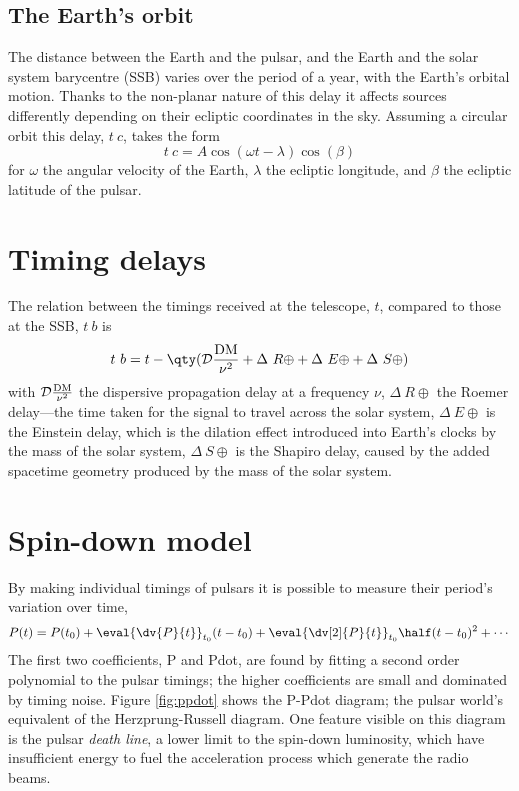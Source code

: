 \subsection{The Earth's orbit}
\label{sec:earths-orbit}

The distance between the Earth and the pulsar, and the Earth and the
solar system barycentre (SSB) varies over the period of a year, with
the Earth's orbital motion. Thanks to the non-planar nature of this
delay it affects sources differently depending on their ecliptic
coordinates in the sky. Assuming a circular orbit this delay, $t~c$,
takes the form
\begin{equation}
  \label{eq:timing-3}
  t~c = A \cos(\omega t - \lambda) \cos(\beta)
\end{equation}
for $\omega$ the angular velocity of the Earth, $\lambda$ the ecliptic
longitude, and $\beta$ the ecliptic latitude of the pulsar.

\section{Timing delays}
\label{sec:timing-delays}

The relation between the timings received at the telescope, $t$,
compared to those at the SSB, $t~b$ is
\begin{equation}
  \label{eq:4}
  t~b = t - \qty( {\cal D} \frac{\DM}{ \nu^2} + \Delta~{R \oplus} + \Delta~{E \oplus} + \Delta~{S \oplus} )
\end{equation}
with ${\cal D} \frac{\operatorname{DM}}{\nu^2}$ the dispersive propagation delay at
a frequency $\nu$, $\Delta~{R \oplus}$ the Roemer delay---the time
taken for the signal to travel across the solar system, $\Delta~{E
  \oplus}$ is the Einstein delay, which is the dilation effect
introduced into Earth's clocks by the mass of the solar system,
$\Delta~{S \oplus}$ is the Shapiro delay, caused by the added
spacetime geometry produced by the mass of the solar system.

\section{Spin-down model}
\label{sec:spin-down-model}

By making individual timings of pulsars it is possible to measure
their period's variation over time,
\begin{equation}
  \label{eq:114}
  P(t) = P(t_0) + \eval{\dv{P}{t}}_{t_0} (t-t_0) + \eval{ \dv[2]{P}{t}}_{t_0} \half (t-t_0)^2 + \cdots
\end{equation}
The first two coefficients, P and Pdot, are found by fitting a second
order polynomial to the pulsar timings; the higher coefficients are
small and dominated by timing noise. Figure \ref{fig:ppdot} shows the
P-Pdot diagram; the pulsar world's equivalent of the Herzprung-Russell
diagram. One feature visible on this diagram is the pulsar \emph{death
  line}, a lower limit to the spin-down luminosity, which have
insufficient energy to fuel the acceleration process which generate
the radio beams.

